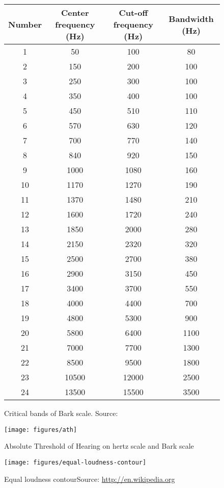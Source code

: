 \begin{figure}[h]
  \centering
  \begin{tabular} { | c | c | c | c | }
  \hline
  Number & Center frequency (Hz) & Cut-off frequency (Hz) & Bandwidth (Hz) \\
  \hline
  1 & 50 & 100 & 80 \\
  \hline
  2 & 150 & 200 & 100 \\
  \hline
  3 & 250 & 300 & 100 \\
  \hline
  4 & 350 & 400 & 100 \\
  \hline
  5 & 450 & 510 & 110 \\
  \hline
  6 & 570 & 630 & 120 \\
  \hline
  7 & 700 & 770 & 140 \\
  \hline
  8 & 840 & 920 & 150 \\
  \hline
  9 & 1000 & 1080 & 160 \\
  \hline
  10 & 1170 & 1270 & 190 \\
  \hline
  11 & 1370 & 1480 & 210 \\
  \hline
  12 & 1600 & 1720 & 240 \\
  \hline
  13 & 1850 & 2000 & 280 \\
  \hline
  14 & 2150 & 2320 & 320 \\
  \hline
  15 & 2500 & 2700 & 380 \\
  \hline
  16 & 2900 & 3150 & 450 \\
  \hline
  17 & 3400 & 3700 & 550 \\
  \hline
  18 & 4000 & 4400 & 700 \\
  \hline
  19 & 4800 & 5300 & 900 \\
  \hline
  20 & 5800 & 6400 & 1100 \\
  \hline
  21 & 7000 & 7700 & 1300 \\
  \hline
  22 & 8500 & 9500 & 1800 \\
  \hline
  23 & 10500 & 12000 & 2500 \\
  \hline
  24 & 13500 & 15500 & 3500 \\
  \hline
  \end{tabular}
  \caption[Critical bands of Bark scale]{Critical bands of Bark scale. Source:~\cite{Bark}}
  \label{fig:bark-table}
\end{figure}

\begin{figure}[p]
  \centering
  \texttt{[image: figures/ath]}
  \caption{Absolute Threshold of Hearing on hertz scale and Bark scale}
  \label{fig:ath-bark}
\end{figure}

\begin{figure}[p]
  \centering
  \texttt{[image: figures/equal-loudness-contour]}
  \caption[Equal loudness contour]{Equal loudness contour\newline Source: \url{http://en.wikipedia.org}}
  \label{fig:equal-loudness}
\end{figure}

